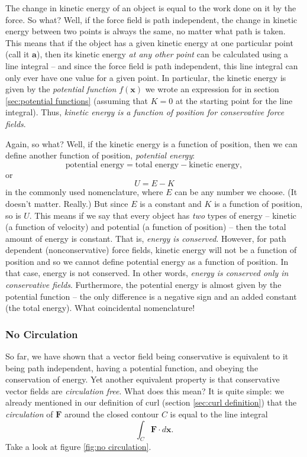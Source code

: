 \documentclass{myarticle}
\renewcommand{\vec}[1]{\mathbf{#1}}
\theoremstyle{nospace}
\newtheorem{old series theorem}{Theorem}
\newenvironment{series theorem}{\begin{mdframed}\begin{old series theorem}}{\end{old series theorem}\end{mdframed}}
\begin{document}
The change in kinetic energy of an object is equal to the work done on it by the force. So what? Well, if the force field is path independent, the change in kinetic energy between two points is always the same, no matter what path is taken. This means that if the object has a given kinetic energy at one particular point (call it $\vec{a}$), then its kinetic energy \textit{at any other point} can be calculated using a line integral -- and since the force field is path independent, this line integral can only ever have one value for a given point. In particular, the kinetic energy is given by the \textit{potential function} $f(\vec{x})$ we wrote an expression for in section \ref{sec:potential functions} (assuming that $K = 0$ at the starting point for the line integral). Thus, \textit{kinetic energy is a function of position for conservative force fields}.

Again, so what? Well, if the kinetic energy is a function of position, then we can define another function of position, \textit{potential energy}: \[ \text{potential energy} = \text{total energy} - \text{kinetic energy}, \] or \[ U = E - K \] in the commonly used nomenclature, where $E$ can be any number we choose. (It doesn't matter. Really.) But since $E$ is a constant and $K$ is a function of position, so is $U$. This means if we say that every object has \textit{two} types of energy -- kinetic (a function of velocity) and potential (a function of position) -- then the total amount of energy is constant. That is, \textit{energy is conserved}. However, for path dependent (nonconservative) force fields, kinetic energy will not be a function of position and so we cannot define potential energy as a function of position. In that case, energy is not conserved. In other words, \textit{energy is conserved only in conservative fields}. Furthermore, the potential energy is almost given by the potential function -- the only difference is a negative sign and an added constant (the total energy). What coincidental nomenclature!

\subsubsection{No Circulation} \label{sec:no circulation}

So far, we have shown that a vector field being conservative is equivalent to it being path independent, having a potential function, and obeying the conservation of energy. Yet another equivalent property is that conservative vector fields are \textit{circulation free}. What does this mean? It is quite simple: we already mentioned in our definition of curl (section \ref{sec:curl definition}) that the \textit{circulation} of $\vec{F}$ around the closed contour $C$ is equal to the line integral \[ \int_C \vec{F} \cdot d\vec{x}. \] Take a look at figure \ref{fig:no circulation}.
\end{document}
